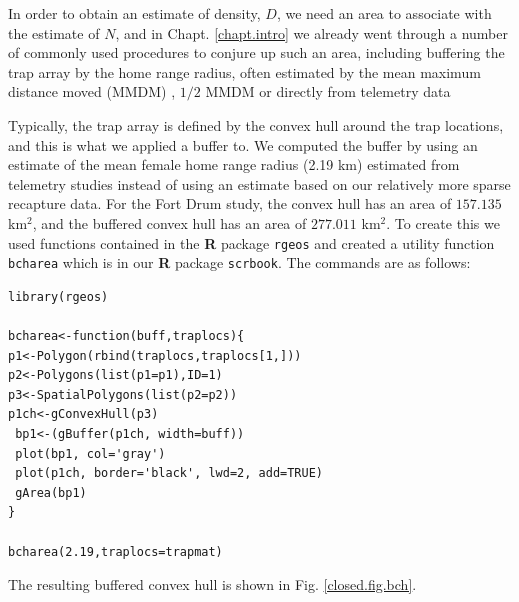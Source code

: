 In order to obtain an estimate of density, $D$, we need an area to
associate with the estimate of $N$, and in Chapt.  \ref{chapt.intro}
we already went through a number of commonly used procedures to
conjure up such an area, including buffering the trap array by the
home range radius, often estimated by the mean maximum distance moved
(MMDM) \citep{parmenter_etal:2003}, $1/2$ MMDM \citep{dice:1938} or
directly from telemetry data \citep{wallace_etal:2003}

Typically, the trap array is defined by the convex hull around the
trap locations, and this is what we applied a buffer to. We computed
the buffer by using an estimate of the mean female home range radius
(2.19 km) estimated from telemetry studies \citep{bales_etal:2005}
instead of using an estimate based on our relatively more sparse
recapture data.  For the Fort Drum study, the convex hull has an area
of $157.135$ km$^2$, and the buffered convex hull has an area of $277.011$
km$^2$.  To create this we used functions contained in the {\bf R}
package \mbox{\tt rgeos} and created a utility function \mbox{\tt
  bcharea} which is in our {\bf R} package \mbox{\tt scrbook}. The
commands are as follows:
\begin{verbatim}
library(rgeos)

bcharea<-function(buff,traplocs){
p1<-Polygon(rbind(traplocs,traplocs[1,]))
p2<-Polygons(list(p1=p1),ID=1)
p3<-SpatialPolygons(list(p2=p2))
p1ch<-gConvexHull(p3)
 bp1<-(gBuffer(p1ch, width=buff))
 plot(bp1, col='gray')
 plot(p1ch, border='black', lwd=2, add=TRUE)
 gArea(bp1)
}

bcharea(2.19,traplocs=trapmat)
\end{verbatim}
The resulting buffered convex hull is shown in Fig. \ref{closed.fig.bch}.
